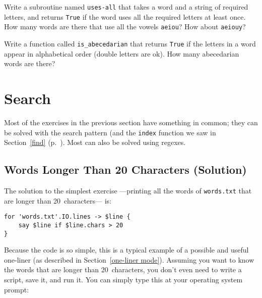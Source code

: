 \begin{exercise} 

Write a subroutine named \verb"uses-all" that takes a word and a
string of required letters, and returns {\tt True} if the word
uses all the required letters at least once.  How many words are there
that use all the vowels {\tt aeiou}?  How about {\tt aeiouy}?

\end{exercise}


\begin{exercise}

Write a function called \verb"is_abecedarian" that returns
{\tt True} if the letters in a word appear in alphabetical order
(double letters are ok).  
How many abecedarian words are there?


\end{exercise}



\section{Search}
\label{search}

Most of the exercises in the previous section have something
in common; they can be solved with the search pattern (and 
the {\tt index} function we saw in Section~\ref{find} 
(p.~\pageref{find}). Most can also be solved using regexes.

\subsection{Words Longer Than 20 Characters (Solution)}

The solution to the simplest exercise ---printing all the 
words of {\tt words.txt} that are longer than 
20~characters--- is:

\begin{verbatim}
for 'words.txt'.IO.lines -> $line {
    say $line if $line.chars > 20
}
\end{verbatim}
%

Because the code is so simple, this is a typical example 
of a possible and useful one-liner (as described in 
Section~\ref{one-liner mode}). Assuming you want to know the words 
that are longer than 20~characters, you don't even need to 
write a script, save it, and run it. You can simply type this at 
your operating system prompt:
\label{one-liner-example}

